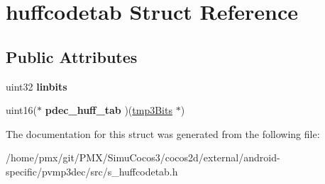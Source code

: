 \hypertarget{structhuffcodetab}{}\section{huffcodetab Struct Reference}
\label{structhuffcodetab}
\subsection*{Public Attributes}
\begin{DoxyCompactItemize}
\item 
\mbox{\label{structhuffcodetab_a915a9119858bc9f316f06aa93b2d42d7}} 
uint32 {\bfseries linbits}
\item 
\mbox{\label{structhuffcodetab_a12653e89ac4dcca185c3fa1b6a975ee4}} 
uint16($\ast$ {\bfseries pdec\+\_\+huff\+\_\+tab} )(\hyperlink{structtmp3Bits}{tmp3\+Bits} $\ast$)
\end{DoxyCompactItemize}


The documentation for this struct was generated from the following file\+:\begin{DoxyCompactItemize}
\item 
/home/pmx/git/\+P\+M\+X/\+Simu\+Cocos3/cocos2d/external/android-\/specific/pvmp3dec/src/s\+\_\+huffcodetab.\+h\end{DoxyCompactItemize}
